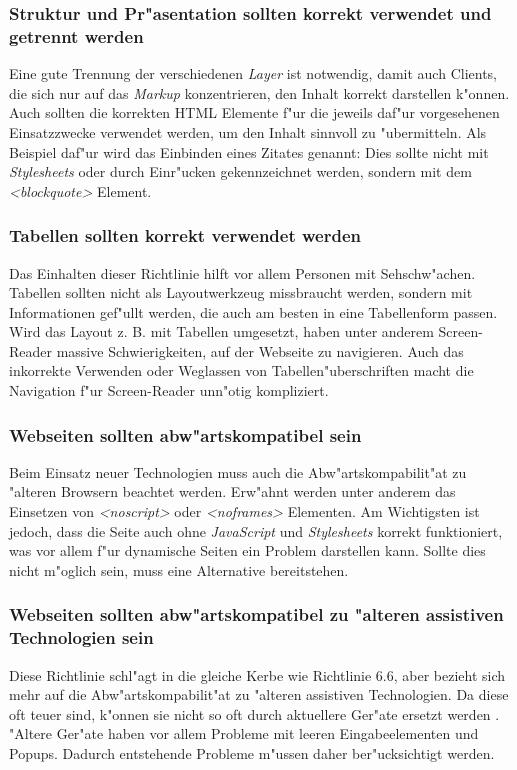 \documentclass[a4paper,bibtotoc,oneside]{scrbook}
\begin{document}
\subsubsection{Struktur und Pr"asentation sollten korrekt verwendet und getrennt werden}
Eine gute Trennung der verschiedenen \emph{Layer} ist notwendig, damit auch Clients, die sich nur auf das \emph{Markup} konzentrieren, den Inhalt korrekt darstellen k"onnen\cite[S. 42-43]{barr_webd}. Auch sollten die korrekten HTML Elemente f"ur die jeweils daf"ur vorgesehenen Einsatzzwecke verwendet werden, um den Inhalt sinnvoll zu "ubermitteln. Als Beispiel daf"ur wird das Einbinden eines Zitates genannt: Dies sollte nicht mit \emph{Stylesheets} oder durch Einr"ucken gekennzeichnet werden, sondern mit dem \emph{<blockquote>} Element. \cite[Abschnitt 6.3]{wcag1}

\subsubsection{Tabellen sollten korrekt verwendet werden}
Das Einhalten dieser Richtlinie hilft vor allem Personen mit Sehschw"achen. Tabellen sollten nicht als Layoutwerkzeug missbraucht werden, sondern mit Informationen gef"ullt werden, die auch am besten in eine Tabellenform passen. Wird das Layout z. B. mit Tabellen umgesetzt, haben unter anderem Screen-Reader massive Schwierigkeiten, auf der Webseite zu navigieren. Auch das inkorrekte Verwenden oder Weglassen von Tabellen"uberschriften macht die Navigation f"ur Screen-Reader unn"otig kompliziert. \cite[Abschnitt 6.5]{wcag1}

\subsubsection{Webseiten sollten abw"artskompatibel sein}
Beim Einsatz neuer Technologien muss auch die Abw"artskompabilit"at zu "alteren Browsern beachtet werden. Erw"ahnt werden unter anderem das Einsetzen von \emph{<noscript>} oder \emph{<noframes>} Elementen. Am Wichtigsten ist jedoch, dass die Seite auch ohne \emph{JavaScript} und \emph{Stylesheets} korrekt funktioniert, was vor allem f"ur dynamische Seiten ein Problem darstellen kann. Sollte dies nicht m"oglich sein, muss eine Alternative bereitstehen. \cite[Abschnitt 6.6]{wcag1}

\subsubsection{Webseiten sollten abw"artskompatibel zu "alteren assistiven Technologien sein}
Diese Richtlinie schl"agt in die gleiche Kerbe wie Richtlinie 6.6, aber bezieht sich mehr auf die Abw"artskompabilit"at zu "alteren assistiven Technologien. Da diese oft teuer sind, k"onnen sie nicht so oft durch aktuellere Ger"ate ersetzt werden \cite[S. 48]{barr_webd}. "Altere Ger"ate haben vor allem Probleme mit leeren Eingabeelementen und Popups. Dadurch entstehende Probleme m"ussen daher ber"ucksichtigt werden. \cite[Abschnitt 6.10]{wcag1}
\end{document}
